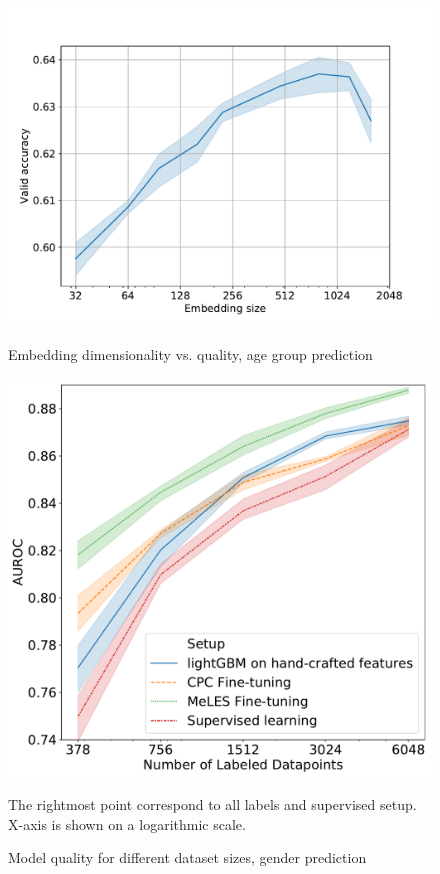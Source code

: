 \documentclass{article}
\begin{document}
\begin{figure}
  \centering
  \begin{minipage}[t]{0.49\linewidth}
    \includegraphics[width=\linewidth]{figures/age-pred-hidden-size.pdf}
    \caption{Embedding dimensionality vs. quality, age group prediction}
    \label{fig-emb-dim-age}
  \end{minipage}
  \hfill%
  \begin{minipage}[t]{0.49\linewidth}
    \includegraphics[width=\linewidth]{figures/ss_gen_4.pdf}
    \caption{Model quality for different dataset sizes, gender prediction}
    \small{The rightmost point correspond to all labels and supervised setup. X-axis is shown on a logarithmic scale.}
    \label{fig-semi-age}
  \end{minipage}
\end{figure}
\end{document}
